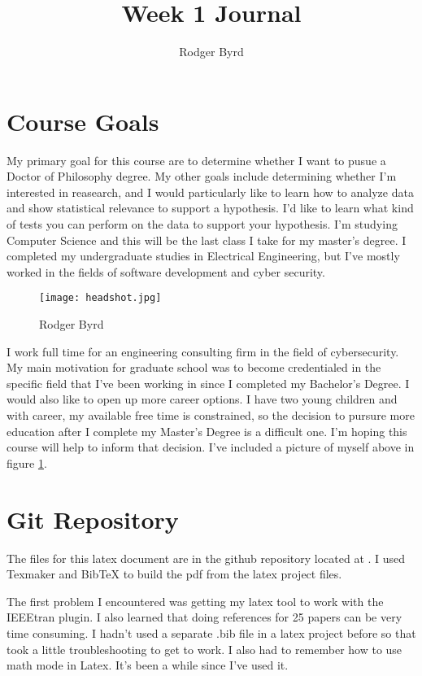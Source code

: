 \documentclass[conference]{IEEEtran}
\begin{document}

\title{Week 1 Journal}
\author{Rodger Byrd}
\maketitle


\section{Course Goals}
My primary goal for this course are to determine whether I want to pusue a Doctor of Philosophy degree. My other goals include determining whether I'm interested in reasearch, and I would particularly like to learn how to analyze data and show statistical relevance to support a hypothesis. I'd like to learn what kind of tests you can perform on the data to support your hypothesis. I'm studying Computer Science and this will be the last class I take for my master's degree. I completed my undergraduate studies in Electrical Engineering, but I've mostly worked in the fields of software development and cyber security.
\begin{figure}[H]
  \centerline{\texttt{[image: headshot.jpg]}}
  \caption{Rodger Byrd}
  \label{fig:HS}
\end{figure} 
I work full time for an engineering consulting firm in the field of cybersecurity. My main motivation for graduate school was to become credentialed in the specific field that I've been working in since I completed my Bachelor's Degree. I would also like to open up more career options. I have two young children and with career, my available free time is constrained, so the decision to pursure more education after I complete my Master's Degree is a difficult one. I'm hoping this course will help to inform that decision. I've included a picture of myself above in figure \ref{fig:HS}.

\section{Git Repository}
The files for this latex document are in the github repository located at . I used Texmaker and BibTeX to build the pdf from the latex project files.

The first problem I encountered was getting my latex tool to work with the IEEEtran plugin. I also learned that doing references for 25 papers can be very time consuming. I hadn't used a separate .bib file in a latex project before so that took a little troubleshooting to get to work. I also had to remember how to use math mode in Latex. It's been a while since I've used it.
\end{document}
